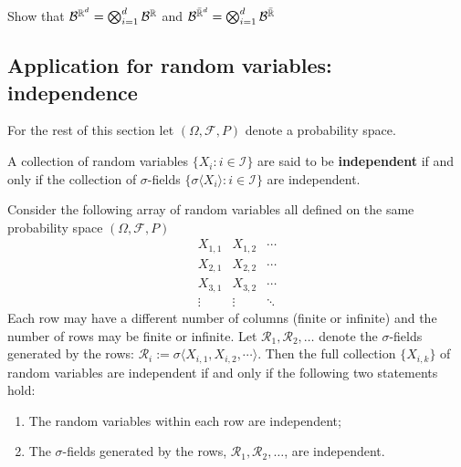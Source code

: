 \begin{exercise} Show that
$\mathcal B^{{\Bbb R}^d}= \bigotimes_{i=1}^d \mathcal B^{{\Bbb R}}$ and $\mathcal B^{\bar{\Bbb R}^d}= \bigotimes_{i=1}^d \mathcal B^{\bar{\Bbb R}}$
\end{exercise}


%
%
\subsection{Application for random variables: independence}




\begin{sectionassumption} For the rest of this section let $(\Omega, \mathcal F, P)$ denote a probability space.
\end{sectionassumption}





\begin{definition}
A collection of random variables $\{X_i: i\in\mathcal I\}$ are said to be {\bf independent} if and only if the collection of $\sigma$-fields $\{\sigma\langle X_i\rangle\colon i\in\mathcal I \}$ are independent.
\end{definition}




\begin{theorem}
Consider the following array of random variables all defined on the same probability space $(\Omega, \mathcal F, P)$
\[
\begin{array}{ccc}
 X_{1,1} &  X_{1,2} & \cdots \\
 X_{2,1} & X_{2,2} & \cdots \\
 X_{3,1} & X_{3,2} & \cdots \\
\vdots & \vdots & \ddots
\end{array}
\]
Each row may have a different number of columns (finite or infinite) and the number of rows may be finite or infinite.
Let $\mathscr R_1,\mathscr R_2,\ldots$ denote the $\sigma$-fields generated by the rows: $\mathscr R_i:=\sigma\langle X_{i,1}, X_{i,2} , \cdots \rangle $.
 Then the full collection  $\{ X_{i,k} \}$ of random variables are independent  if and only if the following two statements hold:
\begin{enumerate}
\item The random variables within each row are independent;
\item The  $\sigma$-fields generated by the rows, $\mathscr R_1,\mathscr R_2,\ldots$, are independent.
\end{enumerate}
\end{theorem}

